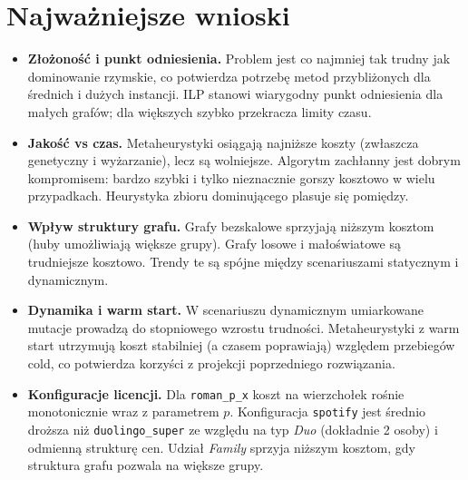 \section{Najważniejsze wnioski}
\begin{itemize}
  \item \textbf{Złożoność i punkt odniesienia.} Problem jest co najmniej tak trudny jak dominowanie rzymskie, co potwierdza potrzebę metod przybliżonych dla średnich i dużych instancji. ILP stanowi wiarygodny punkt odniesienia dla małych grafów; dla większych szybko przekracza limity czasu.
  \item \textbf{Jakość vs czas.} Metaheurystyki osiągają najniższe koszty (zwłaszcza genetyczny i wyżarzanie), lecz są wolniejsze. Algorytm zachłanny jest dobrym kompromisem: bardzo szybki i tylko nieznacznie gorszy kosztowo w wielu przypadkach. Heurystyka zbioru dominującego plasuje się pomiędzy.
  \item \textbf{Wpływ struktury grafu.} Grafy bezskalowe sprzyjają niższym kosztom (huby umożliwiają większe grupy). Grafy losowe i małoświatowe są trudniejsze kosztowo. Trendy te są spójne między scenariuszami statycznym i dynamicznym.
  \item \textbf{Dynamika i warm start.} W scenariuszu dynamicznym umiarkowane mutacje prowadzą do stopniowego wzrostu trudności. Metaheurystyki z warm start utrzymują koszt stabilniej (a czasem poprawiają) względem przebiegów cold, co potwierdza korzyści z projekcji poprzedniego rozwiązania.
  \item \textbf{Konfiguracje licencji.} Dla \texttt{roman\_p\_x} koszt na wierzchołek rośnie monotonicznie wraz z parametrem $p$. Konfiguracja \texttt{spotify} jest średnio droższa niż \texttt{duolingo\_super} ze względu na typ \emph{Duo} (dokładnie 2 osoby) i odmienną strukturę cen. Udział \emph{Family} sprzyja niższym kosztom, gdy struktura grafu pozwala na większe grupy.
\end{itemize}

